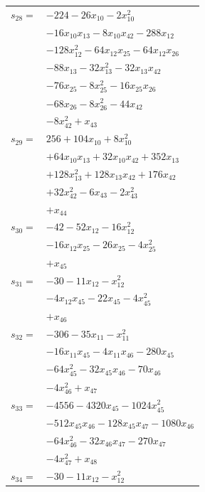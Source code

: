 \begin{longtable}{@{}r@{\;}l@{}}
\(s_{28}=\) & \(\displaystyle -224 -26x_{10} -2x_{10}^{2}\) \\
 & \(\displaystyle -16x_{10}x_{13} -8x_{10}x_{42} -288x_{12}\) \\
 & \(\displaystyle -128x_{12}^{2} -64x_{12}x_{25} -64x_{12}x_{26}\) \\
 & \(\displaystyle -88x_{13} -32x_{13}^{2} -32x_{13}x_{42}\) \\
 & \(\displaystyle -76x_{25} -8x_{25}^{2} -16x_{25}x_{26}\) \\
 & \(\displaystyle -68x_{26} -8x_{26}^{2} -44x_{42}\) \\
 & \(\displaystyle -8x_{42}^{2} +x_{43}\) \\[3pt]
\(s_{29}=\) & \(\displaystyle 256 +104x_{10} +8x_{10}^{2}\) \\
 & \(\displaystyle +64x_{10}x_{13} +32x_{10}x_{42} +352x_{13}\) \\
 & \(\displaystyle +128x_{13}^{2} +128x_{13}x_{42} +176x_{42}\) \\
 & \(\displaystyle +32x_{42}^{2} -6x_{43} -2x_{43}^{2}\) \\
 & \(\displaystyle +x_{44}\) \\[3pt]
\(s_{30}=\) & \(\displaystyle -42 -52x_{12} -16x_{12}^{2}\) \\
 & \(\displaystyle -16x_{12}x_{25} -26x_{25} -4x_{25}^{2}\) \\
 & \(\displaystyle +x_{45}\) \\[3pt]
\(s_{31}=\) & \(\displaystyle -30 -11x_{12} -x_{12}^{2}\) \\
 & \(\displaystyle -4x_{12}x_{45} -22x_{45} -4x_{45}^{2}\) \\
 & \(\displaystyle +x_{46}\) \\[3pt]
\(s_{32}=\) & \(\displaystyle -306 -35x_{11} -x_{11}^{2}\) \\
 & \(\displaystyle -16x_{11}x_{45} -4x_{11}x_{46} -280x_{45}\) \\
 & \(\displaystyle -64x_{45}^{2} -32x_{45}x_{46} -70x_{46}\) \\
 & \(\displaystyle -4x_{46}^{2} +x_{47}\) \\[3pt]
\(s_{33}=\) & \(\displaystyle -4556 -4320x_{45} -1024x_{45}^{2}\) \\
 & \(\displaystyle -512x_{45}x_{46} -128x_{45}x_{47} -1080x_{46}\) \\
 & \(\displaystyle -64x_{46}^{2} -32x_{46}x_{47} -270x_{47}\) \\
 & \(\displaystyle -4x_{47}^{2} +x_{48}\) \\[3pt]
\(s_{34}=\) & \(\displaystyle -30 -11x_{12} -x_{12}^{2}\) \\

\end{longtable}
